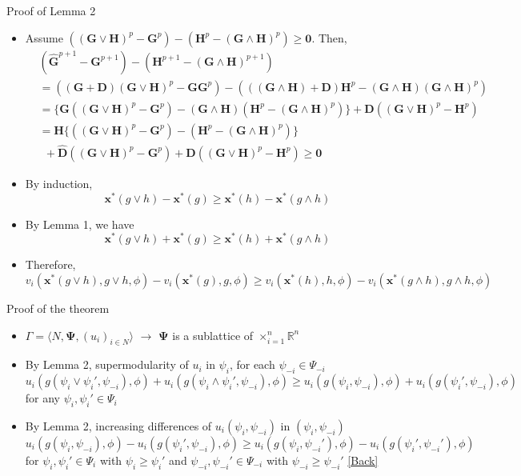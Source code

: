 \documentclass[10pt,dvipdfmx]{beamer}
\begin{document}
\begin{frame}{Proof of Lemma 2}
\begin{itemize}
    \item Assume $((\bm{G} \vee \bm{H})^p - \bm{G}^p) - (\bm{H}^p - (\bm{G} \wedge \bm{H})^p) \ge \bm{0}$. Then,
        {\small{
        \begin{align*}
            & (\bm{\hat{G}}^{p+1} - \bm{G}^{p+1}) - (\bm{H}^{p+1} - (\bm{G} \wedge \bm{H})^{p+1}) \\
                &= ((\bm{G} + \bm{D}) (\bm{G} \vee \bm{H})^p - \bm{G} \bm{G}^p) - (((\bm{G} \wedge \bm{H}) + \bm{D}) \bm{H}^p - (\bm{G} \wedge \bm{H}) (\bm{G} \wedge \bm{H})^p) \\
                &= \{\bm{G}((\bm{G} \vee \bm{H})^p - \bm{G}^p) - (\bm{G} \wedge \bm{H})(\bm{H}^p - (\bm{G} \wedge \bm{H})^p) \} + \bm{D} ((\bm{G} \vee \bm{H})^p - \bm{H}^p) \\
                &= \bm{H}\{((\bm{G} \vee \bm{H})^p - \bm{G}^p) - (\bm{H}^p - (\bm{G} \wedge \bm{H})^p)\} \\
                &\  \  + \bm{\hat{D}} ((\bm{G} \vee \bm{H})^p - \bm{G}^p) + \bm{D} ((\bm{G} \vee \bm{H})^p - \bm{H}^p) \ge \bm{0}
        \end{align*}
        }}
    \item By induction,
        \[ \bm{x}^*(g \vee h) - \bm{x}^*(g) \ge \bm{x}^*(h) - \bm{x}^*(g \wedge h) \]
    \item By Lemma 1, we have
        \[ \bm{x}^*(g \vee h) + \bm{x}^*(g) \ge \bm{x}^*(h) + \bm{x}^*(g \wedge h) \]
    \item Therefore,
        {\small{
        \[ v_i(\bm{x}^*(g \vee h), g \vee h, \phi) - v_i(\bm{x}^*(g), g, \phi) \ge v_i(\bm{x}^*(h), h, \phi) - v_i(\bm{x}^*(g \wedge h), g \wedge h, \phi)\]
        }}
\end{itemize}
\end{frame}

\begin{frame}{Proof of the theorem}
\begin{itemize}
    \item $\Gamma = \langle N, \bm{\Psi}, {(u_i)}_{i \in N} \rangle$ $\rightarrow$ $\bm{\Psi}$ is a sublattice of $\times_{i=1}^n \mathbb{R}^n$
    \item By Lemma 2, supermodularity of $u_i$ in $\psi_i$, for each $\psi_{-i} \in \Psi_{-i}$
        {\small{
        \[ u_i(g(\psi_i \vee \psi_i', \psi_{-i}), \phi) + u_i(g(\psi_i \wedge \psi_i', \psi_{-i}), \phi) \ge u_i(g(\psi_i, \psi_{-i}), \phi) + u_i(g(\psi_i', \psi_{-i}), \phi) \]
        }}
        for any $\psi_i, \psi_i' \in \Psi_i$
    \item By Lemma 2, increasing differences of $u_i(\psi_i, \psi_{-i})$ in $(\psi_i, \psi_{-i})$
        {\small{
        \[ u_i(g(\psi_i, \psi_{-i}), \phi) - u_i(g(\psi_i', \psi_{-i}),\phi) \ge u_i(g(\psi_i, \psi_{-i}'), \phi) - u_i(g(\psi_i', \psi_{-i}'), \phi) \]
        }}
        for $\psi_i, \psi_i' \in \Psi_i$ with $\psi_i \ge \psi_i'$ and $\psi_{-i}, \psi_{-i}' \in \Psi_{-i}$ with $\psi_{-i} \ge \psi_{-i}'$
    \hyperlink{theorem}{[Back]}
\end{itemize}
\end{frame}
\end{document}
